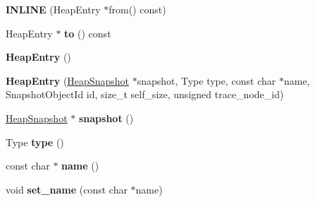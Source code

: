 \begin{DoxyCompactItemize}
\item 
\hypertarget{classv8_1_1internal_1_1_b_a_s_e___e_m_b_e_d_d_e_d_a5219cfd86bae6ceac9426b3bbff72b22}{}{\bfseries I\+N\+L\+I\+N\+E} (Heap\+Entry $\ast$from() const)\label{classv8_1_1internal_1_1_b_a_s_e___e_m_b_e_d_d_e_d_a5219cfd86bae6ceac9426b3bbff72b22}

\item 
\hypertarget{classv8_1_1internal_1_1_b_a_s_e___e_m_b_e_d_d_e_d_a9a669b2c3713f05359908e69c09da8e7}{}Heap\+Entry $\ast$ {\bfseries to} () const \label{classv8_1_1internal_1_1_b_a_s_e___e_m_b_e_d_d_e_d_a9a669b2c3713f05359908e69c09da8e7}

\item 
\hypertarget{classv8_1_1internal_1_1_b_a_s_e___e_m_b_e_d_d_e_d_a3fac8db81409c92ff20fd1690fb765dd}{}{\bfseries Heap\+Entry} ()\label{classv8_1_1internal_1_1_b_a_s_e___e_m_b_e_d_d_e_d_a3fac8db81409c92ff20fd1690fb765dd}

\item 
\hypertarget{classv8_1_1internal_1_1_b_a_s_e___e_m_b_e_d_d_e_d_ad42485558c0afa7d7cb77628861d939b}{}{\bfseries Heap\+Entry} (\hyperlink{classv8_1_1internal_1_1_heap_snapshot}{Heap\+Snapshot} $\ast$snapshot, Type type, const char $\ast$name, Snapshot\+Object\+Id id, size\+\_\+t self\+\_\+size, unsigned trace\+\_\+node\+\_\+id)\label{classv8_1_1internal_1_1_b_a_s_e___e_m_b_e_d_d_e_d_ad42485558c0afa7d7cb77628861d939b}

\item 
\hypertarget{classv8_1_1internal_1_1_b_a_s_e___e_m_b_e_d_d_e_d_a13b246d84ee5ebad0979a0f3a1224bf5}{}\hyperlink{classv8_1_1internal_1_1_heap_snapshot}{Heap\+Snapshot} $\ast$ {\bfseries snapshot} ()\label{classv8_1_1internal_1_1_b_a_s_e___e_m_b_e_d_d_e_d_a13b246d84ee5ebad0979a0f3a1224bf5}

\item 
\hypertarget{classv8_1_1internal_1_1_b_a_s_e___e_m_b_e_d_d_e_d_a558c37801333d66d6cd0b02b8253acd3}{}Type {\bfseries type} ()\label{classv8_1_1internal_1_1_b_a_s_e___e_m_b_e_d_d_e_d_a558c37801333d66d6cd0b02b8253acd3}

\item 
\hypertarget{classv8_1_1internal_1_1_b_a_s_e___e_m_b_e_d_d_e_d_a7eddec1ce86ceae411c915acaa4a82e3}{}const char $\ast$ {\bfseries name} ()\label{classv8_1_1internal_1_1_b_a_s_e___e_m_b_e_d_d_e_d_a7eddec1ce86ceae411c915acaa4a82e3}

\item 
\hypertarget{classv8_1_1internal_1_1_b_a_s_e___e_m_b_e_d_d_e_d_a66f2f47d835c720caf79dd1a5b43dce1}{}void {\bfseries set\+\_\+name} (const char $\ast$name)\label{classv8_1_1internal_1_1_b_a_s_e___e_m_b_e_d_d_e_d_a66f2f47d835c720caf79dd1a5b43dce1}


\end{DoxyCompactItemize}
